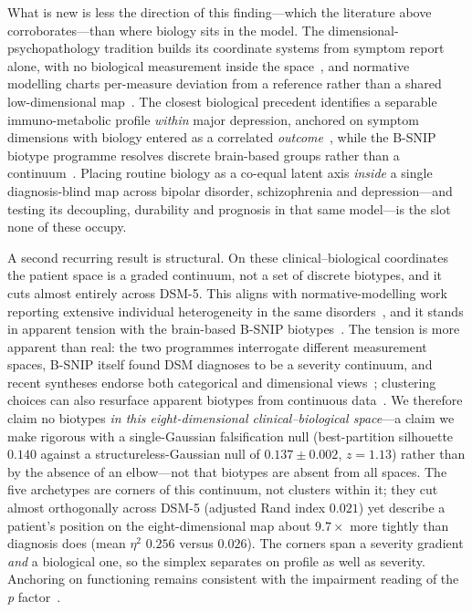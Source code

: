 What is new is less the direction of this finding---which the literature above
corroborates---than where biology sits in the model. The dimensional-psychopathology
tradition builds its coordinate systems from symptom report alone, with no biological
measurement inside the space~\citep{kotov2017hitop}, and normative modelling charts
per-measure deviation from a reference rather than a shared low-dimensional
map~\citep{marquand2016,wolfers2018}. The closest biological precedent identifies a
separable immuno-metabolic profile \emph{within} major depression, anchored on symptom
dimensions with biology entered as a correlated \emph{outcome}~\citep{lamers2013,lamers2020}, while
the B-SNIP biotype programme resolves discrete brain-based groups rather than a
continuum~\citep{clementz2016biotypes}. Placing routine biology as a co-equal latent axis
\emph{inside} a single diagnosis-blind map across bipolar disorder, schizophrenia and
depression---and testing its decoupling, durability and prognosis in that same
model---is the slot none of these occupy.

A second recurring result is structural. On these clinical--biological coordinates the
patient space is a graded continuum, not a set of discrete biotypes, and it cuts
almost entirely across DSM-5. This aligns with normative-modelling work reporting
extensive individual heterogeneity in the same
disorders~\citep{wolfers2018,marquand2016,segal2023}, and it stands in apparent
tension with the brain-based B-SNIP biotypes~\citep{clementz2016biotypes,clementz2020}.
The tension is more apparent than real: the two programmes interrogate different
measurement spaces, B-SNIP itself found DSM diagnoses to be a severity continuum, and
recent syntheses endorse both categorical and dimensional
views~\citep{clementz2024}; clustering choices can also resurface apparent biotypes
from continuous data~\citep{pan2026}. We therefore claim no biotypes \emph{in this
eight-dimensional clinical--biological space}---a claim we make rigorous with a
single-Gaussian falsification null (best-partition silhouette $0.140$ against a
structureless-Gaussian null of $0.137 \pm 0.002$, $z = 1.13$) rather than by the
absence of an elbow---not that biotypes are absent from all spaces. The five
archetypes are corners of this continuum, not clusters within it; they cut almost
orthogonally across DSM-5 (adjusted Rand index $0.021$) yet describe a patient's position
on the eight-dimensional map about $9.7\times$ more tightly than diagnosis does (mean
$\eta^2$ $0.256$ versus $0.026$). The corners span a severity gradient \emph{and} a biological one, so the simplex separates on profile as well as severity. Anchoring \Gfac{} on functioning remains consistent with the impairment reading of the \textit{p} factor~\citep{caspi2014pfactor,lahey2017general}.

